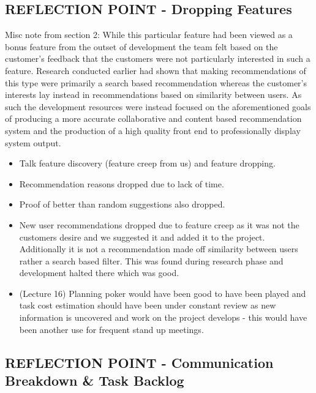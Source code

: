 \documentclass{l3proj}
\begin{document}
\subsection{REFLECTION POINT - Dropping Features}
\label{sec:droppingreflection}

Misc note from section 2:
While this particular feature had been viewed as a bonus feature from the outset of development the team felt based on the customer’s feedback that the customers were not particularly interested in such a feature. Research conducted earlier had shown that making recommendations of this type were primarily a search based recommendation whereas the customer’s interests lay instead in recommendations based on similarity between users. As such the development resources were instead focused on the aforementioned goals of producing a more accurate collaborative and content based recommendation system and the production of a high quality front end to professionally display system output. 
\begin{itemize}
\item Talk feature discovery (feature creep from us) and feature dropping.
\item Recommendation reasons dropped due to lack of time.
\item Proof of better than random suggestions also dropped.
\item New user recommendations dropped due to feature creep as it was not the customers desire and we suggested it and added it to the project. Additionally it is not a recommendation made off similarity between users rather a search based filter. This was found during research phase and development halted there which was good.
\item (Lecture 16) Planning poker would have been good to have been played and task cost estimation should have been under constant review as new information is uncovered and work on the project develops - this would have been another use for frequent stand up meetings.
\end{itemize}


\subsection{REFLECTION POINT - Communication Breakdown \& Task Backlog}
\label{sec:communicationbreakdown}
\end{document}
